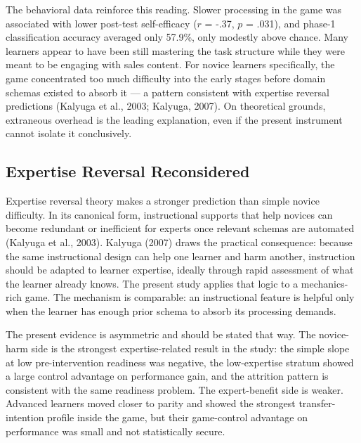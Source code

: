\documentclass[12pt]{report}
\begin{document}
The behavioral data reinforce this reading. Slower processing in the game was associated with lower post-test self-efficacy ($r$ = -.37, $p$ = .031), and phase-1 classification accuracy averaged only 57.9\%, only modestly above chance. Many learners appear to have been still mastering the task structure while they were meant to be engaging with sales content. For novice learners specifically, the game concentrated too much difficulty into the early stages before domain schemas existed to absorb it --- a pattern consistent with expertise reversal predictions (Kalyuga et al., 2003; Kalyuga, 2007). On theoretical grounds, extraneous overhead is the leading explanation, even if the present instrument cannot isolate it conclusively.

\subsection{Expertise Reversal Reconsidered}
Expertise reversal theory makes a stronger prediction than simple novice difficulty. In its canonical form, instructional supports that help novices can become redundant or inefficient for experts once relevant schemas are automated (Kalyuga et al., 2003). Kalyuga (2007) draws the practical consequence: because the same instructional design can help one learner and harm another, instruction should be adapted to learner expertise, ideally through rapid assessment of what the learner already knows. The present study applies that logic to a mechanics-rich game. The mechanism is comparable: an instructional feature is helpful only when the learner has enough prior schema to absorb its processing demands.

The present evidence is asymmetric and should be stated that way. The novice-harm side is the strongest expertise-related result in the study: the simple slope at low pre-intervention readiness was negative, the low-expertise stratum showed a large control advantage on performance gain, and the attrition pattern is consistent with the same readiness problem. The expert-benefit side is weaker. Advanced learners moved closer to parity and showed the strongest transfer-intention profile inside the game, but their game-control advantage on performance was small and not statistically secure.
\end{document}

